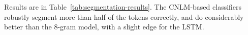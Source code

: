



Results are in Table~\ref{tab:segmentation-results}. The
CNLM-based classifiers robustly segment more than half of the tokens
correctly, and do considerably better than the 8-gram model,
with a slight edge for the LSTM.%


